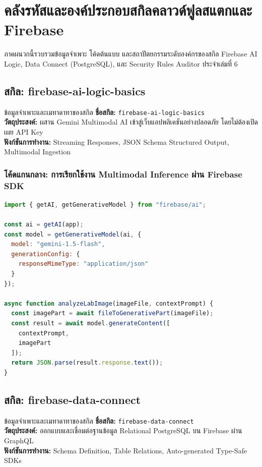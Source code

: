 \chapter{คลังรหัสและองค์ประกอบสกิลคลาวด์ฟูลสแตกและ Firebase}

ภาคผนวกนี้รวบรวมข้อมูลจำเพาะ โค้ดต้นแบบ และสถาปัตยกรรมระดับองค์กรของสกิล Firebase AI Logic, Data Connect (PostgreSQL), และ Security Rules Auditor ประจำเล่มที่ 6

\section{สกิล: firebase-ai-logic-basics}

\begin{teachingplan}{ข้อมูลจำเพาะและเมทาดาทาของสกิล}
\textbf{ชื่อสกิล:} \texttt{firebase-ai-logic-basics}\\
\textbf{วัตถุประสงค์:} ผสาน Gemini Multimodal AI เข้าสู่เว็บแอปพลิเคชันอย่างปลอดภัย โดยไม่ต้องเปิดเผย API Key\\
\textbf{ฟังก์ชันการทำงาน:} Streaming Responses, JSON Schema Structured Output, Multimodal Ingestion
\end{teachingplan}

\subsection{โค้ดแกนกลาง: การเรียกใช้งาน Multimodal Inference ผ่าน Firebase SDK}

\begin{lstlisting}[language=JavaScript, caption={Client-Side Firebase AI Logic Integration}]
import { getAI, getGenerativeModel } from "firebase/ai";

const ai = getAI(app);
const model = getGenerativeModel(ai, {
  model: "gemini-1.5-flash",
  generationConfig: {
    responseMimeType: "application/json"
  }
});

async function analyzeLabImage(imageFile, contextPrompt) {
  const imagePart = await fileToGenerativePart(imageFile);
  const result = await model.generateContent([
    contextPrompt, 
    imagePart
  ]);
  return JSON.parse(result.response.text());
}
\end{lstlisting}

\section{สกิล: firebase-data-connect}

\begin{teachingplan}{ข้อมูลจำเพาะและเมทาดาทาของสกิล}
\textbf{ชื่อสกิล:} \texttt{firebase-data-connect}\\
\textbf{วัตถุประสงค์:} ออกแบบและเชื่อมต่อฐานข้อมูล Relational PostgreSQL บน Firebase ผ่าน GraphQL\\
\textbf{ฟังก์ชันการทำงาน:} Schema Definition, Table Relations, Auto-generated Type-Safe SDKs
\end{teachingplan}

